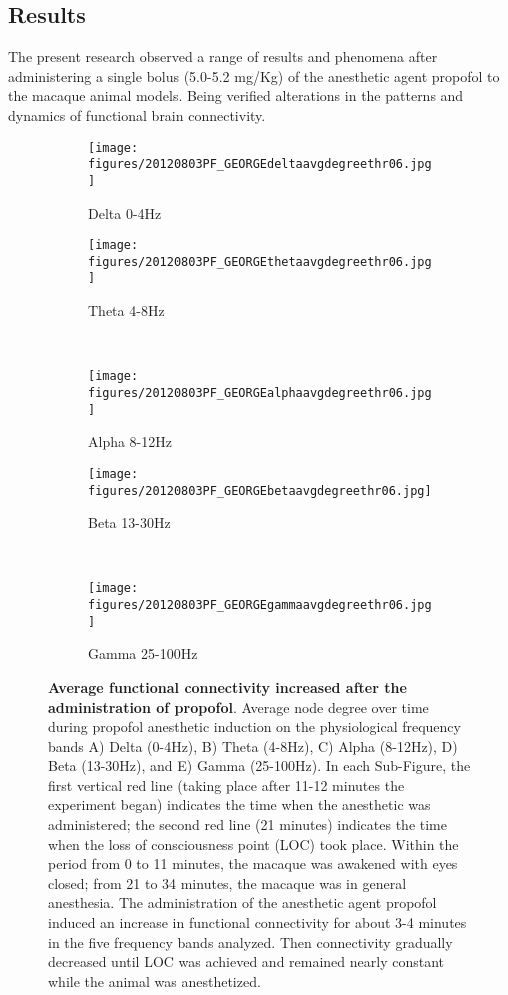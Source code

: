 \documentclass[twoside]{article}
\begin{document}
\begin{multicols}{2}
\section{Results}


The present research observed a range of results and phenomena after administering a single bolus (5.0-5.2 mg/Kg) of the anesthetic agent propofol to the macaque animal models. Being verified alterations in the patterns and dynamics of functional brain connectivity.


\end{multicols}

\begin{figure}[!h]
\begin{subfigure}{.5\textwidth}
  \centering
  \texttt{[image: figures/20120803PF\_GEORGEdeltaavgdegreethr06.jpg]}
  \caption{Delta 0-4Hz}
  \label{fig:sfig1}
\end{subfigure}%
\begin{subfigure}{.5\textwidth}
  \centering
  \texttt{[image: figures/20120803PF\_GEORGEthetaavgdegreethr06.jpg]}
 \caption{Theta 4-8Hz}
  \label{fig:sfig2}
\end{subfigure}\\
\centering
\begin{subfigure}{.5\textwidth}
\texttt{[image: figures/20120803PF\_GEORGEalphaavgdegreethr06.jpg]}
  \caption{Alpha 8-12Hz}
  \label{fig:sfig3}
\end{subfigure}%
\begin{subfigure}{.5\textwidth}
  \centering
  \texttt{[image: figures/20120803PF\_GEORGEbetaavgdegreethr06.jpg]}
  \caption{Beta 13-30Hz}
  \label{fig:sfig4}
\end{subfigure}\\
\centering
\begin{subfigure}{.5\textwidth}
\texttt{[image: figures/20120803PF\_GEORGEgammaavgdegreethr06.jpg]}
  \caption{Gamma 25-100Hz}
  \label{fig:sfig3}
\end{subfigure}%
\caption{\textbf{Average functional connectivity increased after the administration of propofol}. Average node degree over time during propofol anesthetic induction on the physiological frequency bands A) Delta (0-4Hz), B) Theta (4-8Hz), C) Alpha (8-12Hz), D) Beta (13-30Hz), and E) Gamma (25-100Hz). In each Sub-Figure, the first vertical red line (taking place after 11-12 minutes the experiment began) indicates the time when the anesthetic was administered; the second red line (21 minutes) indicates the time when the loss of consciousness point (LOC) took place. Within the period from 0 to 11 minutes, the macaque was awakened with eyes closed; from 21 to 34 minutes, the macaque was in general anesthesia. The administration of the anesthetic agent propofol induced an increase in functional connectivity for about 3-4 minutes in the five frequency bands analyzed. Then connectivity gradually decreased until LOC was achieved and remained nearly constant while the animal was anesthetized.}

\end{figure}
\end{document}
